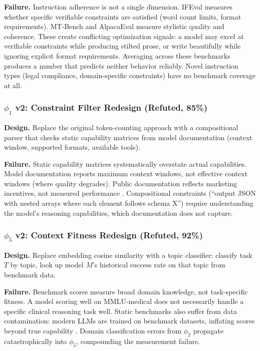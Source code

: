 \textbf{Failure.} Instruction adherence is not a single dimension. IFEval measures whether specific verifiable constraints are satisfied (word count limits, format requirements). MT-Bench and AlpacaEval measure stylistic quality and coherence. These create conflicting optimization signals: a model may excel at verifiable constraints while producing stilted prose, or write beautifully while ignoring explicit format requirements. Averaging across these benchmarks produces a number that predicts neither behavior reliably. Novel instruction types (legal compliance, domain-specific constraints) have no benchmark coverage at all.

\subsubsection{$\phi_1$ v2: Constraint Filter Redesign (Refuted, 85\%)}

\textbf{Design.} Replace the original token-counting approach with a compositional parser that checks static capability matrices from model documentation (context window, supported formats, available tools).

\textbf{Failure.} Static capability matrices systematically overstate actual capabilities. Model documentation reports maximum context windows, not effective context windows (where quality degrades). Public documentation reflects marketing incentives, not measured performance \citep{liu2023lost}. Compositional constraints (``output JSON with nested arrays where each element follows schema X'') require understanding the model's reasoning capabilities, which documentation does not capture.

\subsubsection{$\phi_5$ v2: Context Fitness Redesign (Refuted, 92\%)}

\textbf{Design.} Replace embedding cosine similarity with a topic classifier: classify task $T$ by topic, look up model $M$'s historical success rate on that topic from benchmark data.

\textbf{Failure.} Benchmark scores measure broad domain knowledge, not task-specific fitness. A model scoring well on MMLU-medical does not necessarily handle a specific clinical reasoning task well. Static benchmarks also suffer from data contamination: modern LLMs are trained on benchmark datasets, inflating scores beyond true capability \citep{deng2023leaderboards}. Domain classification errors from $\phi_2$ propagate catastrophically into $\phi_5$, compounding the measurement failure.

